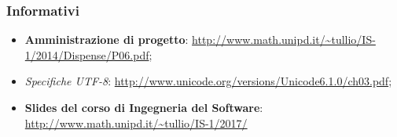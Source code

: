 \subsubsection{Informativi}
\begin{itemize}
	\item \textbf{Amministrazione di progetto}: \url{http://www.math.unipd.it/~tullio/IS-1/2014/Dispense/P06.pdf};
	\item \textit{Specifiche \textit{UTF-8}}: \url{http://www.unicode.org/versions/Unicode6.1.0/ch03.pdf};
	\item \textbf{Slides del corso di Ingegneria del Software}:
	\url{http://www.math.unipd.it/~tullio/IS-1/2017/}
\end{itemize}
